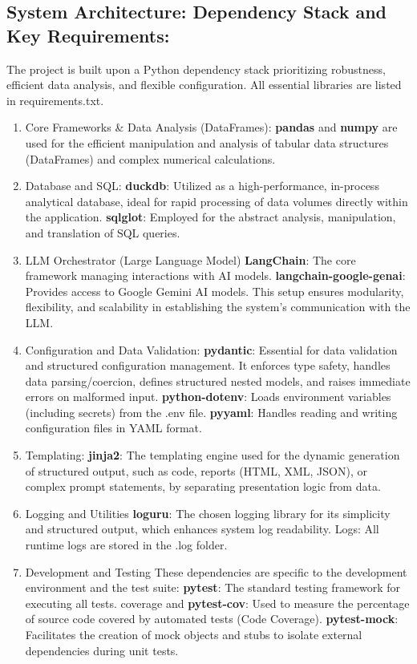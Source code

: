 \documentclass[12pt,a4paper]{article}
\begin{document}
\subsection{System Architecture: Dependency Stack and Key Requirements:}
The project is built upon a Python dependency stack prioritizing robustness, efficient data analysis, and flexible configuration. All essential libraries are listed in requirements.txt.
\begin{enumerate}
  \item Core Frameworks \& Data Analysis (DataFrames):
  \textbf{pandas} and \textbf{numpy} are used for the efficient manipulation and analysis of tabular data structures (DataFrames) and complex numerical calculations.
  \item Database and SQL:
  \textbf{duckdb}: Utilized as a high-performance, in-process analytical database, ideal for rapid processing of data volumes directly within the application.
  \textbf{sqlglot}: Employed for the abstract analysis, manipulation, and translation of SQL queries.
  \item LLM Orchestrator (Large Language Model)
  \textbf{LangChain}: The core framework managing interactions with AI models.
  \textbf{langchain-google-genai}: Provides access to Google Gemini AI models. This setup ensures modularity, flexibility, and scalability in establishing the system's communication with the LLM.
  \item  Configuration and Data Validation:
  \textbf{pydantic}: Essential for data validation and structured configuration management. It enforces type safety, handles data parsing/coercion, defines structured nested models, and raises immediate errors on malformed input.
  \textbf{python-dotenv}: Loads environment variables (including secrets) from the .env file.
  \textbf{pyyaml}: Handles reading and writing configuration files in YAML format.
  \item  Templating: \textbf{jinja2}: The templating engine used for the dynamic generation of structured output, such as code, reports (HTML, XML, JSON), or complex prompt statements, by separating presentation logic from data.
  \item Logging and Utilities
  \textbf{loguru}: The chosen logging library for its simplicity and structured output, which enhances system log readability.
  Logs: All runtime logs are stored in the .log folder.
  \item Development and Testing
  These dependencies are specific to the development environment and the test suite:
  \textbf{pytest}: The standard testing framework for executing all tests.
  coverage and \textbf{pytest-cov}: Used to measure the percentage of source code covered by automated tests (Code Coverage).
  \textbf{pytest-mock}: Facilitates the creation of mock objects and stubs to isolate external dependencies during unit tests.


\end{enumerate}
\end{document}
